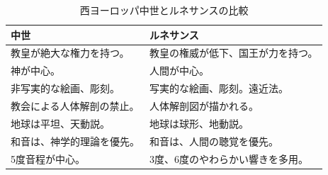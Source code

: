 \documentclass[a4j]{jarticle}
\begin{document}
\begin{table}[tb]
 \begin{center}
  \caption{西ヨーロッパ中世とルネサンスの比較}
  \label{tab:comparison}
  \begin{tabular}{|l|l|} \hline
  中世                       & ルネサンス                         \\
  \hline \hline
  教皇が絶大な権力を持つ。   & 教皇の権威が低下、国王が力を持つ。 \\ \hline
  神が中心。                 & 人間が中心。                       \\ \hline
  非写実的な絵画、彫刻。     & 写実的な絵画、彫刻。遠近法。       \\ \hline
  教会による人体解剖の禁止。 & 人体解剖図が描かれる。             \\ \hline
  地球は平坦、天動説。       & 地球は球形、地動説。               \\ \hline
  和音は、神学的理論を優先。 & 和音は、人間の聴覚を優先。         \\
  5度音程が中心。            & 3度、6度のやわらかい響きを多用。   \\ \hline
  \end{tabular}
 \end{center}
\end{table}
\end{document}
